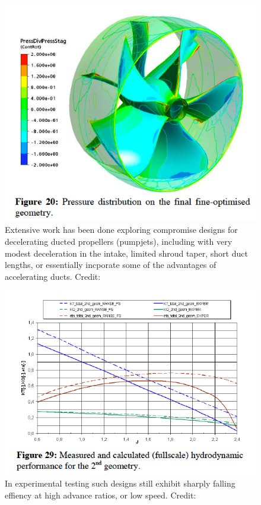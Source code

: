 \documentclass{article}\usepackage[]{graphicx}\usepackage[]{color}
\begin{document}
\begin{figure}
\includegraphics[width=\textwidth]{FineOptimised.png}
\caption{Extensive work has been done exploring compromise designs for decelerating ducted propellers (pumpjets), including with very modest deceleration in the intake, limited shroud taper, short duct lengths, or essentially incporate some of the advantages of accelerating ducts. Credit: \cite{abdel2010}}
\label{fig:FineOptimised.png}
\end{figure}

\begin{figure}
\includegraphics[width=\textwidth]{FineEfficiency.png}
\caption{In experimental testing such designs still exhibit sharply falling effiency at high advance ratios, or low speed. Credit:  \cite{abdel2010}}
\label{fig:FineEfficiency.png}
\end{figure}
\end{document}
